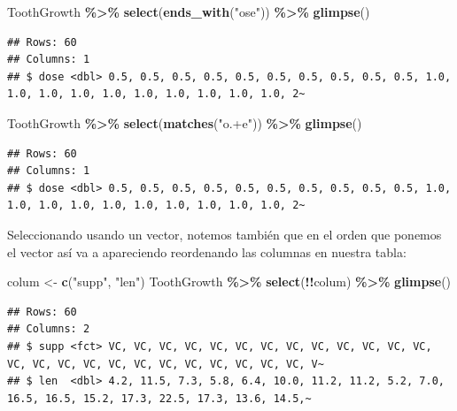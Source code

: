 \documentclass[
]{book}
\newenvironment{Shaded}{\begin{snugshade}}{\end{snugshade}}
\newcommand{\FunctionTok}[1]{\textcolor[rgb]{0.13,0.29,0.53}{\textbf{#1}}}
\newcommand{\NormalTok}[1]{#1}
\newcommand{\OtherTok}[1]{\textcolor[rgb]{0.56,0.35,0.01}{#1}}
\newcommand{\SpecialCharTok}[1]{\textcolor[rgb]{0.81,0.36,0.00}{\textbf{#1}}}
\newcommand{\StringTok}[1]{\textcolor[rgb]{0.31,0.60,0.02}{#1}}
\begin{document}
\begin{Shaded}
\begin{Highlighting}[]
\NormalTok{ToothGrowth }\SpecialCharTok{\%\textgreater{}\%} \FunctionTok{select}\NormalTok{(}\FunctionTok{ends\_with}\NormalTok{(}\StringTok{"ose"}\NormalTok{)) }\SpecialCharTok{\%\textgreater{}\%} \FunctionTok{glimpse}\NormalTok{()}
\end{Highlighting}
\end{Shaded}

\begin{verbatim}
## Rows: 60
## Columns: 1
## $ dose <dbl> 0.5, 0.5, 0.5, 0.5, 0.5, 0.5, 0.5, 0.5, 0.5, 0.5, 1.0, 1.0, 1.0, 1.0, 1.0, 1.0, 1.0, 1.0, 1.0, 1.0, 2~
\end{verbatim}

\begin{Shaded}
\begin{Highlighting}[]
\NormalTok{ToothGrowth }\SpecialCharTok{\%\textgreater{}\%} \FunctionTok{select}\NormalTok{(}\FunctionTok{matches}\NormalTok{(}\StringTok{"o.+e"}\NormalTok{)) }\SpecialCharTok{\%\textgreater{}\%} \FunctionTok{glimpse}\NormalTok{()}
\end{Highlighting}
\end{Shaded}

\begin{verbatim}
## Rows: 60
## Columns: 1
## $ dose <dbl> 0.5, 0.5, 0.5, 0.5, 0.5, 0.5, 0.5, 0.5, 0.5, 0.5, 1.0, 1.0, 1.0, 1.0, 1.0, 1.0, 1.0, 1.0, 1.0, 1.0, 2~
\end{verbatim}

\hfill\break
Seleccionando usando un vector, notemos también que en el orden que ponemos el vector así va a apareciendo reordenando las columnas en nuestra tabla:

\begin{Shaded}
\begin{Highlighting}[]
\NormalTok{colum }\OtherTok{\textless{}{-}} \FunctionTok{c}\NormalTok{(}\StringTok{"supp"}\NormalTok{, }\StringTok{"len"}\NormalTok{)}
\NormalTok{ToothGrowth  }\SpecialCharTok{\%\textgreater{}\%}  \FunctionTok{select}\NormalTok{(}\SpecialCharTok{!!}\NormalTok{colum) }\SpecialCharTok{\%\textgreater{}\%} \FunctionTok{glimpse}\NormalTok{()}
\end{Highlighting}
\end{Shaded}

\begin{verbatim}
## Rows: 60
## Columns: 2
## $ supp <fct> VC, VC, VC, VC, VC, VC, VC, VC, VC, VC, VC, VC, VC, VC, VC, VC, VC, VC, VC, VC, VC, VC, VC, VC, VC, V~
## $ len  <dbl> 4.2, 11.5, 7.3, 5.8, 6.4, 10.0, 11.2, 11.2, 5.2, 7.0, 16.5, 16.5, 15.2, 17.3, 22.5, 17.3, 13.6, 14.5,~
\end{verbatim}
\end{document}
